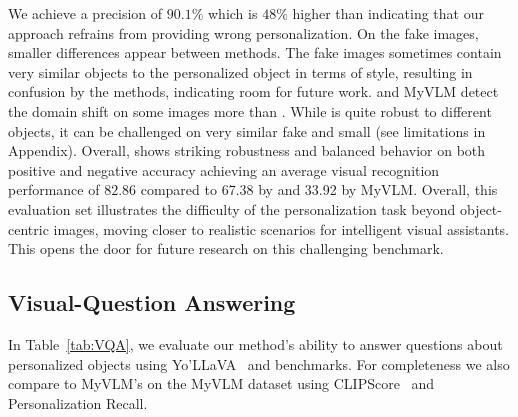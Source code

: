 We achieve a  precision of $90.1\%$ which is $48\%$ higher than \yollava indicating that our approach refrains from providing wrong personalization. On the fake images, smaller differences appear between methods. The fake images sometimes contain very similar objects to the personalized object in terms of style, resulting in confusion by the methods, indicating room for future work. \yollava and MyVLM detect the domain shift on some images more than \ours. While \ours is quite robust to different objects, it  can be challenged on very similar fake and small (see limitations in Appendix). Overall, \ours shows striking robustness and balanced behavior on both positive and negative accuracy achieving an average visual recognition performance of $82.86$ compared to 67.38 by \yollava and 33.92 by MyVLM.  
Overall, this evaluation set illustrates the difficulty of the personalization task beyond object-centric images, moving closer to realistic scenarios for intelligent visual assistants. This opens the door for future research on this challenging benchmark.
\vspace{-0.1cm}
\subsection{Visual-Question Answering}
\vspace{-0.1cm}
In Table~\ref{tab:VQA}, we evaluate our method’s ability to answer questions about personalized objects using  Yo’LLaVA~\cite{nguyen2024yo} and  \thisismy benchmarks.
For completeness we also compare \ours  to MyVLM's on the MyVLM dataset using  CLIPScore~\cite{hessel2021clipscore} and Personalization Recall.

